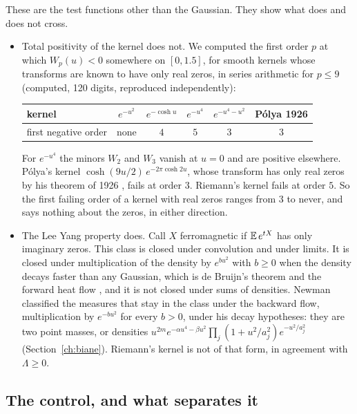 These are the test functions other than the Gaussian. They show what does and does not cross.
\begin{itemize}
\item Total positivity of the kernel does not. We computed the first order $p$ at which $W_p(u)<0$ somewhere on $[0,1.5]$, for smooth kernels whose transforms are known to have only real zeros, in series arithmetic for $p\le9$ (computed, 120 digits, reproduced independently):
\begin{center}
\footnotesize
\begin{tabular}{lccccc}
\toprule
kernel & $e^{-u^2}$ & $e^{-\cosh u}$ & $e^{-u^4}$ & $e^{-u^4-u^2}$ & P\'olya 1926\\
\midrule
first negative order & none & $4$ & $5$ & $3$ & $3$\\
\bottomrule
\end{tabular}
\end{center}
For $e^{-u^4}$ the minors $W_2$ and $W_3$ vanish at $u=0$ and are positive elsewhere. P\'olya's kernel $\cosh(9u/2)\,e^{-2\pi\cosh2u}$, whose transform has only real zeros by his theorem of 1926 \cite{Polya}, fails at order $3$. Riemann's kernel fails at order $5$. So the first failing order of a kernel with real zeros ranges from $3$ to never, and says nothing about the zeros, in either direction.
\item The Lee Yang property does. Call $X$ ferromagnetic if $\mathbb{E}\,e^{tX}$ has only imaginary zeros. This class is closed under convolution and under limits. It is closed under multiplication of the density by $e^{bu^2}$ with $b\ge0$ when the density decays faster than any Gaussian, which is de Bruijn's theorem and the forward heat flow \cite{deBruijn}, and it is not closed under sums of densities. Newman \cite{Newman1976} classified the measures that stay in the class under the backward flow, multiplication by $e^{-bu^2}$ for every $b>0$, under his decay hypotheses: they are two point masses, or densities $u^{2m}e^{-\alpha u^4-\beta u^2}\prod_j(1+u^2/a_j^2)e^{-u^2/a_j^2}$ (Section~\ref{ch:biane}). Riemann's kernel is not of that form, in agreement with $\Lambda\ge0$.
\end{itemize}

\subsection{The control, and what separates it}

